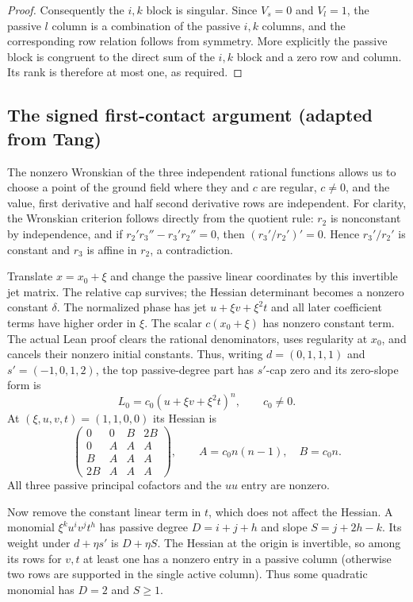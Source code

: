 \documentclass[11pt,a4paper]{article}
\begin{document}
\begin{proof}
Consequently the $i,k$ block is singular. Since $V_s=0$ and $V_l=1$, the passive $l$ column is a combination of the passive $i,k$ columns, and the corresponding row relation follows from symmetry. More explicitly the passive block is congruent to the direct sum of the $i,k$ block and a zero row and column. Its rank is therefore at most one, as required.
\end{proof}


\subsection{The signed first-contact argument (adapted from Tang)}
The nonzero Wronskian of the three independent rational functions allows us to choose a point of the ground field where they and $c$ are regular, $c\ne0$, and the value, first derivative and half second derivative rows are independent. For clarity, the Wronskian criterion follows directly from the quotient rule: $r_2$ is nonconstant by independence, and if $r_2'r_3''-r_3'r_2''=0$, then $(r_3'/r_2')'=0$. Hence $r_3'/r_2'$ is constant and $r_3$ is affine in $r_2$, a contradiction.

Translate $x=x_0+\xi$ and change the passive linear coordinates by this invertible jet matrix. The relative cap survives; the Hessian determinant becomes a nonzero constant $\delta$. The normalized phase has jet $u+\xi v+\xi^2t$ and all later coefficient terms have higher order in $\xi$. The scalar $c(x_0+\xi)$ has nonzero constant term. The actual Lean proof clears the rational denominators, uses regularity at $x_0$, and cancels their nonzero initial constants. Thus, writing $d=(0,1,1,1)$ and $s'=(-1,0,1,2)$, the top passive-degree part has $s'$-cap zero and its zero-slope form is
\[
 L_0=c_0(u+\xi v+\xi^2t)^n,\qquad c_0\ne0.
\]
At $(\xi,u,v,t)=(1,1,0,0)$ its Hessian is
\[
 \begin{pmatrix}
 0&0&B&2B\\0&A&A&A\\B&A&A&A\\2B&A&A&A
 \end{pmatrix},
 \qquad A=c_0n(n-1),\quad B=c_0n .
\]
All three passive principal cofactors and the $uu$ entry are nonzero.

Now remove the constant linear term in $t$, which does not affect the Hessian. A monomial $\xi^ku^iv^jt^h$ has passive degree $D=i+j+h$ and slope $S=j+2h-k$. Its weight under $d+\eta s'$ is $D+\eta S$. The Hessian at the origin is invertible, so among its rows for $v,t$ at least one has a nonzero entry in a passive column (otherwise two rows are supported in the single active column). Thus some quadratic monomial has $D=2$ and $S\ge1$.
\end{document}
